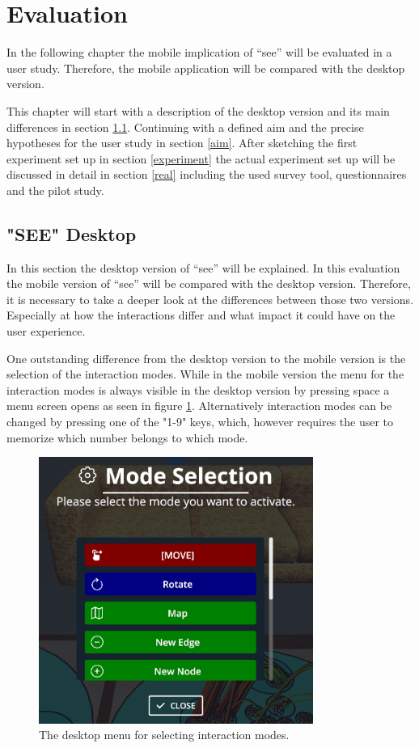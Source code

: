 \section{Evaluation}
\label{section:evaluation}
In the following chapter the mobile implication of \enquote{\gls{see}} will be evaluated in a user study.
Therefore, the mobile application will be compared with the desktop version.

This chapter will start with a description of the desktop version and its main differences in section \ref{desktop}. 
Continuing with a defined aim and the precise hypotheses for the user study in section \ref{aim}.
After sketching the first experiment set up in section \ref{experiment} the actual experiment set up will be discussed in detail in section \ref{real} including the used survey tool, questionnaires and the pilot study.
\subsection{"SEE" Desktop}
\label{desktop}
In this section the desktop version of \enquote{\gls{see}} will be explained. 
In this evaluation the mobile version of \enquote{\gls{see}} will be compared with the desktop version.
Therefore, it is necessary to take a deeper look at the differences between those two versions.
Especially at how the interactions differ and what impact it could have on the user experience.

One outstanding difference from the desktop version to the mobile version is the selection of the interaction modes.
While in the mobile version the menu for the interaction modes is always visible in the desktop version by pressing space a menu screen opens as seen in figure \ref{fig:menu}.
Alternatively interaction modes can be changed by pressing one of the "1-9" keys, which, however requires the user to memorize which number belongs to which mode.

\begin{figure}[htb]
  \centering
  \includegraphics[width=0.8\textwidth]{Evaluation/img/menu.png}
  \caption{The desktop menu for selecting interaction modes.}\label{fig:menu}
\end{figure}

